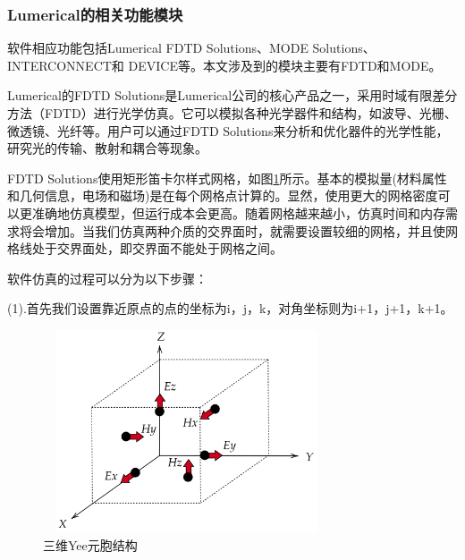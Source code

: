 \documentclass[UTF8,a4paper,12pt]{ctexart}
\numberwithin{equation}{section}
\begin{document}
\subsubsection{Lumerical的相关功能模块}
软件相应功能包括Lumerical FDTD Solutions、MODE Solutions、INTERCONNECT和 DEVICE等。本文涉及到的模块主要有FDTD和MODE。

Lumerical的FDTD Solutions是Lumerical公司的核心产品之一，采用时域有限差分方法（FDTD）进行光学仿真。它可以模拟各种光学器件和结构，如波导、光栅、微透镜、光纤等。用户可以通过FDTD Solutions来分析和优化器件的光学性能，研究光的传输、散射和耦合等现象。

FDTD Solutions使用矩形笛卡尔样式网格，如图\ref{3-1}所示。基本的模拟量(材料属性和几何信息，电场和磁场)是在每个网格点计算的。显然，使用更大的网格密度可以更准确地仿真模型，但运行成本会更高。随着网格越来越小，仿真时间和内存需求将会增加。当我们仿真两种介质的交界面时，就需要设置较细的网格，并且使网格线处于交界面处，即交界面不能处于网格之间。


软件仿真的过程可以分为以下步骤：

(1).首先我们设置靠近原点的点的坐标为i，j，k，对角坐标则为i+1，j+1，k+1。

\begin{figure}[htbp]
\setcounter{figure}{0}
\centering %
\includegraphics[height=6cm,width=8.5cm]{fig3.png}
\caption{三维Yee元胞结构}
\label{3-1}
\end{figure}
\end{document}
